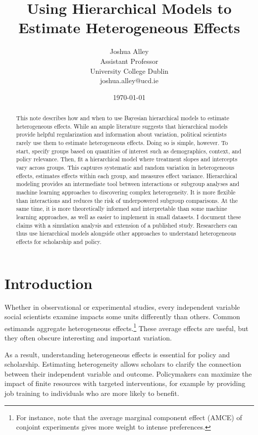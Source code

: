 \documentclass[12pt]{article}
\title{\textbf{Using Hierarchical Models to Estimate Heterogeneous Effects}}
\author{Joshua Alley \\
Assistant Professor \\
University College Dublin \\
joshua.alley@ucd.ie
}
\date{\today}
\begin{document}
\maketitle 

\begin{abstract} 
This note describes how and when to use Bayesian hierarchical models to estimate heterogeneous effects. 
While an ample literature suggests that hierarchical models provide helpful regularization and information about variation, political scientists rarely use them to estimate heterogeneous effects. 
Doing so is simple, however. 
To start, specify groups based on quantities of interest such as demographics, context, and policy relevance.  
Then, fit a hierarchical model where treatment slopes and intercepts vary across groups.
This captures systematic and random variation in heterogeneous effects, estimates effects within each group, and measures effect variance. 
Hierarchical modeling provides an intermediate tool between interactions or subgroup analyses and machine learning approaches to discovering complex heterogeneity. 
It is more flexible than interactions and reduces the risk of underpowered subgroup comparisons.
At the same time, it is more theoretically informed and interpretable than some machine learning approaches, as well as easier to implement in small datasets. 
I document these claims with a simulation analysis and extension of a published study. 
Researchers can thus use hierarchical models alongside other approaches to understand heterogeneous effects for scholarship and policy.
\end{abstract} 


\newpage 
\doublespace 


\section{Introduction}


Whether in observational or experimental studies, every independent variable social scientists examine impacts some units differently than others. 
Common estimands aggregate heterogeneous effects.\footnote{For instance, \citet{Abramsonetal2022} note that the average marginal component effect (AMCE) of conjoint experiments gives more weight to intense preferences.} 
These average effects are useful, but they often obscure interesting and important variation. 


As a result, understanding heterogeneous effects is essential for policy and scholarship. 
Estimating heterogeneity allows scholars to clarify the connection between their independent variable and outcome.
Policymakers can maximize the impact of finite resources with targeted interventions, for example by providing job training to individuals who are more likely to benefit. 
\end{document}
